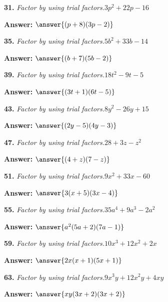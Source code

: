 \documentclass{ximera}
\begin{document}
\begin{problem}
\textbf{31.} \emph{Factor by using trial factors.}\quad $3p^2 + 22p - 16$

\textbf{Answer:} $\answer{(p +8)(3p -2)}$
\end{problem}

\begin{problem}
\textbf{35.} \emph{Factor by using trial factors.}\quad $5b^2 + 33b - 14$

\textbf{Answer:} $\answer{(b +7)(5b -2)}$
\end{problem}

\begin{problem}
\textbf{39.} \emph{Factor by using trial factors.}\quad $18t^2 - 9t - 5$

\textbf{Answer:} $\answer{(3t +1)(6t -5)}$
\end{problem}

\begin{problem}
\textbf{43.} \emph{Factor by using trial factors.}\quad $8y^2 - 26y + 15$

\textbf{Answer:} $\answer{(2y -5)(4y -3)}$
\end{problem}

\begin{problem}
\textbf{47.} \emph{Factor by using trial factors.}\quad $28 + 3z - z^2$

\textbf{Answer:} $\answer{(4 +z)(7 -z)}$
\end{problem}

\begin{problem}
\textbf{51.} \emph{Factor by using trial factors.}\quad $9x^2 + 33x - 60$

\textbf{Answer:} $\answer{3(x +5)(3x -4)}$
\end{problem}

\begin{problem}
\textbf{55.} \emph{Factor by using trial factors.}\quad $35a^4 + 9a^3 - 2a^2$

\textbf{Answer:} $\answer{a^2(5a +2)(7a -1)}$
\end{problem}

\begin{problem}
\textbf{59.} \emph{Factor by using trial factors.}\quad $10x^3 + 12x^2 + 2x$

\textbf{Answer:} $\answer{2x(x +1)(5x +1)}$
\end{problem}

\begin{problem}
\textbf{63.} \emph{Factor by using trial factors.}\quad $9x^3y + 12x^2y + 4xy$

\textbf{Answer:} $\answer{xy(3x +2)(3x +2)}$
\end{problem}
\end{document}
